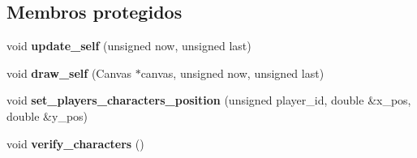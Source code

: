 \subsection*{Membros protegidos}
\begin{DoxyCompactItemize}
\item 
\mbox{\label{classDeathMatchLevel_a104d4fac94d1ce45bb2548ea5467d53e}} 
void {\bfseries update\+\_\+self} (unsigned now, unsigned last)
\item 
\mbox{\label{classDeathMatchLevel_a38a915a954f5c8e8ba54c46057bc99d0}} 
void {\bfseries draw\+\_\+self} (Canvas $\ast$canvas, unsigned now, unsigned last)
\item 
\mbox{\label{classDeathMatchLevel_ab158f20b6f8d51254215553aa713b4cc}} 
void {\bfseries set\+\_\+players\+\_\+characters\+\_\+position} (unsigned player\+\_\+id, double \&x\+\_\+pos, double \&y\+\_\+pos)
\item 
\mbox{\label{classDeathMatchLevel_a5aa8c8eaaba63e222c692581c1f59c1a}} 
void {\bfseries verify\+\_\+characters} ()
\end{DoxyCompactItemize}
